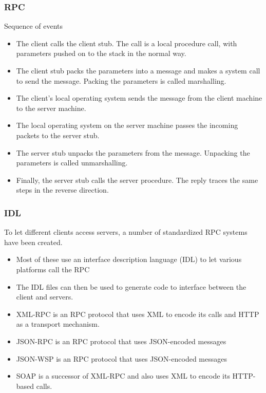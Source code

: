 \documentclass{beamer}
\begin{document}
 \begin{frame}
 	\frametitle{RPC}
 	Sequence of events
 	\begin{itemize}   	
	   \item The client calls the client stub. The call is a local procedure call, with parameters pushed on to the stack in the normal way.
    	\item The client stub packs the parameters into a message and makes a system call to send the message. Packing the parameters is called marshalling.
    	\item The client's local operating system sends the message from the client machine to the server machine.
    	\item The local operating system on the server machine passes the incoming packets to the server stub.
    	\item The server stub unpacks the parameters from the message. Unpacking the parameters is called unmarshalling.
    	\item Finally, the server stub calls the server procedure. The reply traces the same steps in the reverse direction.
   	\end{itemize}
   \end{frame} 
   \begin{frame}
   	\frametitle{IDL}
   	To let different clients access servers, a number of standardized RPC systems have been created.
   	\begin{itemize}
        \item Most of these use an interface description language (IDL) to let various platforms call the RPC
        \item The IDL files can then be used to generate code to interface between the client and servers.
    \end{itemize}
    \begin{itemize}
	    \item XML-RPC is an RPC protocol that uses XML to encode its calls and HTTP as a transport mechanism.
	    \item JSON-RPC is an RPC protocol that uses JSON-encoded messages
	    \item JSON-WSP is an RPC protocol that uses JSON-encoded messages
	    \item SOAP is a successor of XML-RPC and also uses XML to encode its HTTP-based calls.
    \end{itemize}
     \end{frame} 
     
\end{document}
